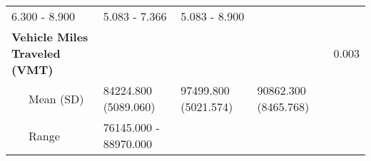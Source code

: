 \begin{longtable}[c]{@{}lllll@{}}
\begin{minipage}[t]{0.15\columnwidth}
6.300 - 8.900
\end{minipage} & \begin{minipage}[t]{0.15\columnwidth}\raggedright
5.083 - 7.366
\end{minipage} & \begin{minipage}[t]{0.15\columnwidth}\raggedright
5.083 - 8.900
\end{minipage} & \begin{minipage}[t]{0.52\columnwidth}\raggedright
\end{minipage}
\\\addlinespace
\begin{minipage}[t]{0.33\columnwidth}\raggedright
\textbf{Vehicle Miles Traveled (VMT)}
\end{minipage} & \begin{minipage}[t]{0.15\columnwidth}\raggedright
\end{minipage} & \begin{minipage}[t]{0.15\columnwidth}\raggedright
\end{minipage} & \begin{minipage}[t]{0.15\columnwidth}\raggedright
\end{minipage} & \begin{minipage}[t]{0.52\columnwidth}\raggedright
0.003
\end{minipage}
\\\addlinespace
\begin{minipage}[t]{0.33\columnwidth}\raggedright
~~~Mean (SD)
\end{minipage} & \begin{minipage}[t]{0.15\columnwidth}\raggedright
84224.800 (5089.060)
\end{minipage} & \begin{minipage}[t]{0.15\columnwidth}\raggedright
97499.800 (5021.574)
\end{minipage} & \begin{minipage}[t]{0.15\columnwidth}\raggedright
90862.300 (8465.768)
\end{minipage} & \begin{minipage}[t]{0.52\columnwidth}\raggedright
\end{minipage}
\\\addlinespace
\begin{minipage}[t]{0.33\columnwidth}\raggedright
~~~Range
\end{minipage} & \begin{minipage}[t]{0.15\columnwidth}\raggedright
76145.000 - 88970.000
\end{minipage} & \begin{minipage}[t]{0.15\columnwidth}\raggedright

\end{minipage}
\end{longtable}
